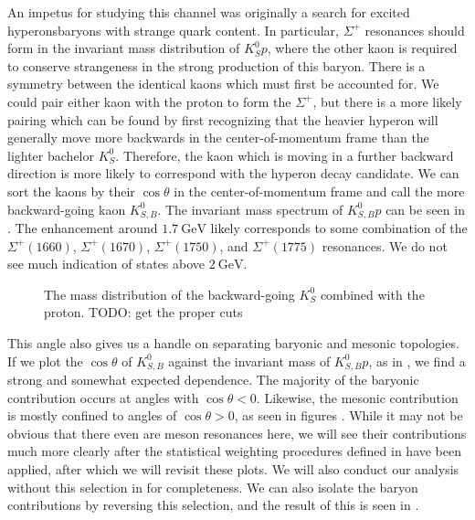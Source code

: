 An impetus for studying this channel was originally a search for excited hyperons\textemdash baryons with strange quark content. In particular, $\Sigma^+$ resonances should form in the invariant mass distribution of $K_S^0 p$, where the other kaon is required to conserve strangeness in the strong production of this baryon. There is a symmetry between the identical kaons which must first be accounted for. We could pair either kaon with the proton to form the $\Sigma^+$, but there is a more likely pairing which can be found by first recognizing that the heavier hyperon will generally move more backwards in the center-of-momentum frame than the lighter bachelor $K_S^0$. Therefore, the kaon which is moving in a further backward direction is more likely to correspond with the hyperon decay candidate. We can sort the kaons by their $\cos\theta$ in the center-of-momentum frame and call the more backward-going kaon $K_{S,B}^0$. The invariant mass spectrum of $K_{S,B}^0 p$ can be seen in . The enhancement around $\SI{1.7}{\giga\electronvolt}$ likely corresponds to some combination of the $\Sigma^+(1660)$, $\Sigma^+(1670)$, $\Sigma^+(1750)$, and $\Sigma^+(1775)$ resonances. We do not see much indication of states above $\SI{2}{\giga\electronvolt}$.

\begin{figure}
  \begin{center}
    
  \end{center}
  \caption{The mass distribution of the backward-going $K_S^0$ combined with the proton. {\color{red}TODO: get the proper cuts}}\label{fig:baryon-mass-data-pz-masscut-chisqdof-3.0}
\end{figure}


This angle also gives us a handle on separating baryonic and mesonic topologies. If we plot the $\cos\theta$ of $K_{S,B}^0$ against the invariant mass of $K_{S,B}^0 p$, as in , we find a strong and somewhat expected dependence. The majority of the baryonic contribution occurs at angles with $\cos\theta < 0$. Likewise, the mesonic contribution is mostly confined to angles of $\cos\theta > 0$, as seen in figures . While it may not be obvious that there even are meson resonances here, we will see their contributions much more clearly after the statistical weighting procedures defined in  have been applied, after which we will revisit these plots. We will also conduct our analysis without this selection in  for completeness. We can also isolate the baryon contributions by reversing this selection, and the result of this is seen in .

